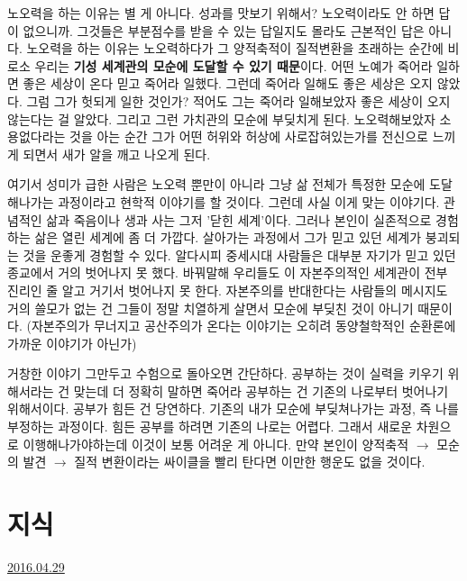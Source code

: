 노오력을 하는 이유는 별 게 아니다. 성과를 맛보기 위해서? 노오력이라도 안 하면 답이 없으니까.
그것들은 부분점수를 받을 수 있는 답일지도 몰라도 근본적인 답은 아니다.
노오력을 하는 이유는 노오력하다가 그 양적축적이 질적변환을 초래하는 순간에 비로소 우리는 \textbf{기성 세계관의 모순에 도달할 수 있기 때문}이다.
어떤 노예가 죽어라 일하면 좋은 세상이 온다 믿고 죽어라 일했다. 그런데 죽어라 일해도 좋은 세상은 오지 않았다.
그럼 그가 헛되게 일한 것인가? 적어도 그는 죽어라 일해보았자 좋은 세상이 오지 않는다는 걸 알았다. 그리고 그런 가치관의 모순에 부딪치게 된다.
노오력해보았자 소용없다라는 것을 아는 순간 그가 어떤 허위와 허상에 사로잡혀있는가를 전신으로 느끼게 되면서 새가 알을 깨고 나오게 된다.
\vspace{5mm}

여기서 성미가 급한 사람은 노오력 뿐만이 아니라 그냥 삶 전체가 특정한 모순에 도달해나가는 과정이라고 현학적 이야기를 할 것이다.
그런데 사실 이게 맞는 이야기다. 관념적인 삶과 죽음이나 생과 사는 그저 '닫힌 세계'이다.
그러나 본인이 실존적으로 경험하는 삶은 열린 세계에 좀 더 가깝다.
살아가는 과정에서 그가 믿고 있던 세계가 붕괴되는 것을 운좋게 경험할 수 있다.
알다시피 중세시대 사람들은 대부분 자기가 믿고 있던 종교에서 거의 벗어나지 못 했다.
바꿔말해 우리들도 이 자본주의적인 세계관이 전부 진리인 줄 알고 거기서 벗어나지 못 한다.
자본주의를 반대한다는 사람들의 메시지도 거의 쓸모가 없는 건 그들이 정말 치열하게 살면서 모순에 부딪친 것이 아니기 때문이다.
(자본주의가 무너지고 공산주의가 온다는 이야기는 오히려 동양철학적인 순환론에 가까운 이야기가 아닌가)
\vspace{5mm}

거창한 이야기 그만두고 수험으로 돌아오면 간단하다.
공부하는 것이 실력을 키우기 위해서라는 건 맞는데 더 정확히 말하면 죽어라 공부하는 건 기존의 나로부터 벗어나기 위해서이다.
공부가 힘든 건 당연하다. 기존의 내가 모순에 부딪쳐나가는 과정, 즉 나를 부정하는 과정이다.
힘든 공부를 하려면 기존의 나로는 어렵다. 그래서 새로운 차원으로 이행해나가야하는데 이것이 보통 어려운 게 아니다.
만약 본인이 양적축적 $\rightarrow$ 모순의 발견 $\rightarrow$ 질적 변환이라는 싸이클을 빨리 탄다면 이만한 행운도 없을 것이다.
\vspace{5mm}






\section{지식}
\href{https://www.kockoc.com/Apoc/751991}{2016.04.29}

\vspace{5mm}

